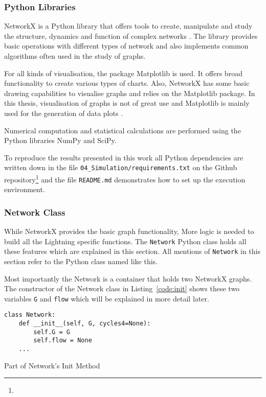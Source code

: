 \documentclass[final]{fhnwreport}       %
\begin{document}
\subsubsection{Python Libraries}
NetworkX is a Python library that offers tools to create, manipulate and study the structure, dynamics and function of complex networks \citep{al-taie_python_2017}. The library provides basic operations with different types of network and also implements common algorithms often used in the study of graphs.  

For all kinds of visualisation, the package Matplotlib is used. It offers broad functionality to create various types of charts. Also, NetworkX has some basic drawing capabilities to visualise graphs and relies on the Matplotlib package. In this thesis, visualisation of graphs is not of great use and Matplotlib is mainly used for the generation of data plots \citep{al-taie_python_2017}.

Numerical computation and statistical calculations are performed using the Python libraries NumPy and SciPy. 

To reproduce the results presented in this work all Python dependencies are written down in the file \texttt{04\_Simulation/requirements.txt} on the Github repository\footnote{\github} and the file \texttt{README.md} demonstrates how to set up the execution environment.

\subsubsection{Network Class}
While NetworkX provides the basic graph functionality, More logic is needed to build all the Lightning specific functions. The \texttt{Network} Python class holds all these features which are explained in this section. All mentions of \texttt{Network} in this section refer to the Python class named like this.

Most importantly the Network is a container that holds two NetworkX graphs. The constructor of the Network class in Listing~\ref{code:init} shows these two variables \texttt{G} and \texttt{flow} which will be explained in more detail later.

\begin{listing}[H]
  \begin{verbatim}
class Network:
    def __init__(self, G, cycles4=None):
        self.G = G
        self.flow = None
	...
  \end{verbatim}
  \caption{Part of Network's Init Method}
  \label{code:init}
\end{listing}
\end{document}
